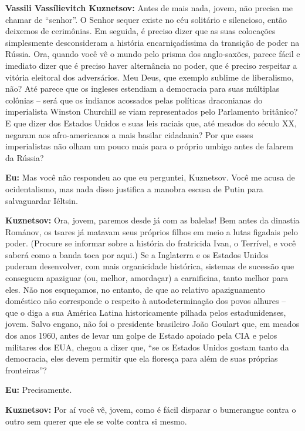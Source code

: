 \textbf{Vassili Vassílievitch Kuznetsov:} Antes de mais nada, jovem, não
precisa me chamar de ``senhor''. O Senhor sequer existe no céu solitário
e silencioso, então deixemos de cerimônias. Em seguida, é preciso dizer
que as suas colocações simplesmente desconsideram a história
encarniçadíssima da transição de poder na Rússia. Ora, quando você vê o
mundo pelo prisma dos anglo-saxões, parece fácil e imediato dizer que é
preciso haver alternância no poder, que é preciso respeitar a vitória
eleitoral dos adversários. Meu Deus, que exemplo sublime de liberalismo,
não? Até parece que os ingleses estendiam a democracia para suas
múltiplas colônias -- será que os indianos acossados pelas políticas
draconianas do imperialista Winston Churchill se viam representados pelo
Parlamento britânico? E que dizer dos Estados Unidos e suas leis raciais
que, até meados do século XX, negaram aos afro-americanos a mais basilar
cidadania? Por que esses imperialistas não olham um pouco mais para o
próprio umbigo antes de falarem da Rússia?

\textbf{Eu:} Mas você não respondeu ao que eu perguntei, Kuznetsov. Você
me acusa de ocidentalismo, mas nada disso justifica a manobra escusa de
Putin para salvaguardar Iéltsin.

\textbf{Kuznetsov:} Ora, jovem, paremos desde já com as balelas! Bem
antes da dinastia Románov, os tsares já matavam seus próprios filhos em
meio a lutas figadais pelo poder. (Procure se informar sobre a história
do fratricida Ivan, o Terrível, e você saberá como a banda toca por
aqui.) Se a Inglaterra e os Estados Unidos puderam desenvolver, com mais
organicidade histórica, sistemas de sucessão que conseguem apaziguar
(ou, melhor, amordaçar) a carnificina, tanto melhor para eles. Não nos
esqueçamos, no entanto, de que ao relativo apaziguamento doméstico não
corresponde o respeito à autodeterminação dos povos alhures -- que o
diga a sua América Latina historicamente pilhada pelos estadunidenses,
jovem. Salvo engano, não foi o presidente brasileiro João Goulart que,
em meados dos anos 1960, antes de levar um golpe de Estado apoiado pela
CIA e pelos militares dos EUA, chegou a dizer que, ``se os Estados
Unidos gostam tanto da democracia, eles devem permitir que ela floresça
para além de suas próprias fronteiras''?

\textbf{Eu:} Precisamente.

\textbf{Kuznetsov:} Por aí você vê, jovem, como é fácil disparar o
bumerangue contra o outro sem querer que ele se volte contra si mesmo.


